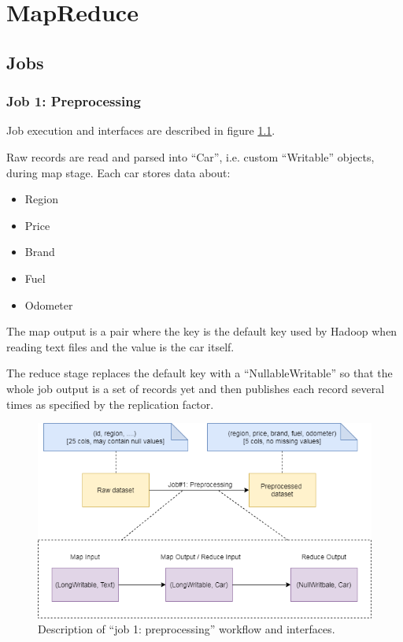 \chapter{MapReduce}

\section{Jobs}

\subsection{Job 1: Preprocessing}

Job execution and interfaces are described in figure \ref{fig:MR-job-1}.
 
Raw records are read and parsed into ``Car'', i.e. custom ``Writable'' objects, during map stage. 
Each car stores data about:
\begin{itemize}
 \item Region
 \item Price
 \item Brand
 \item Fuel
 \item Odometer
\end{itemize}

The map output is a pair where the key is the default key used by Hadoop when reading text files and the value is the car itself.

The reduce stage replaces the default key with a ``NullableWritable'' so that the whole job output is a set of records yet and then publishes each record several times as specified by the replication factor.

\begin{figure}[H]
	\centering
	\includegraphics[scale=0.7]{images/2-mapreduce/MR-job-1.png}
	\caption{Description of ``job 1: preprocessing'' workflow and interfaces.}
	\label{fig:MR-job-1}
\end{figure}


